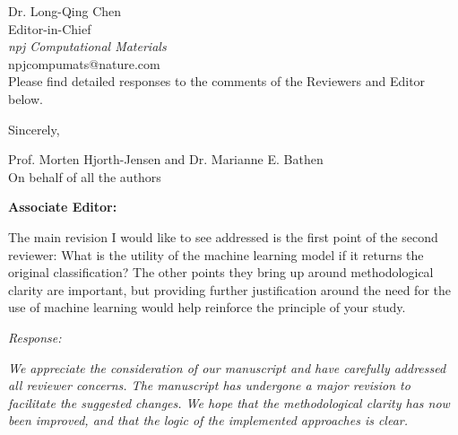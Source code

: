 \documentclass[11pt, a4paper]{letter} %
\begin{document}
\begin{letter}{
	Dr. Long-Qing Chen\\
	Editor-in-Chief\\
	\textit{npj Computational Materials} \\ 
	npjcompumats@nature.com \\ 
}
Please find detailed responses to the comments of the Reviewers and Editor below.

Sincerely,  

\noindent Prof. Morten Hjorth-Jensen and Dr. Marianne E. Bathen \\
On behalf of all the authors 






\end{letter}



\newpage 


\noindent
\textbf{Associate Editor:}

The main revision I would like to see addressed is the first point of the second reviewer: What is the utility of the machine learning model if it returns the original classification? The other points they bring up around methodological clarity are important, but providing further justification around the need for the use of machine learning would help reinforce the principle of your study. 


\textit{Response: }

\textit{We appreciate the consideration of our manuscript and have carefully addressed all reviewer concerns. The manuscript has undergone a major revision to facilitate the suggested changes. We hope that the methodological clarity has now been improved, and that the logic of the implemented approaches is clear. }
\end{document}
